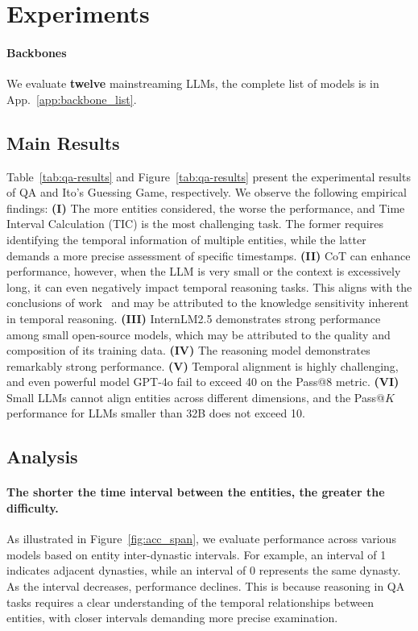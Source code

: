 

\section{Experiments}
\paragraph{Backbones}
We evaluate \textbf{twelve} mainstreaming LLMs,
the complete list of models is in App.~\ref{app:backbone_list}.
\subsection{Main Results}
Table~\ref{tab:qa-results} and Figure~\ref{tab:qa-results} present the experimental results of QA and Ito's Guessing Game, respectively.
We observe the following empirical findings:
\textbf{(I)} The more entities considered, the worse the performance, and Time Interval Calculation (TIC) is the most challenging task.
The former requires identifying the temporal information of multiple entities, while the latter demands a more precise assessment of specific timestamps.
\textbf{(II)} CoT can enhance performance, however, when the LLM is very small or the context is excessively long, it can even negatively impact temporal reasoning tasks.
This aligns with the conclusions of work~\cite{chu-etal-2024-timebench} and may be attributed to the knowledge sensitivity inherent in temporal reasoning.
\textbf{(III)} InternLM2.5 demonstrates strong performance among small open-source models, which may be attributed to the quality and composition of its training data.
\textbf{(IV)} The reasoning model demonstrates remarkably strong performance.
\textbf{(V)} Temporal alignment is highly challenging, and even powerful model GPT-4o fail to exceed 40 on the Pass@8 metric.
\textbf{(VI)} Small LLMs cannot align entities across different dimensions, and the Pass@$K$ performance for LLMs smaller than 32B does not exceed 10.

\subsection{Analysis}
\paragraph{The shorter the time interval between the entities, the greater the difficulty.}
As illustrated in Figure~\ref{fig:acc_span}, we evaluate performance across various models based on entity inter-dynastic intervals.
For example, an interval of 1 indicates adjacent dynasties, while an interval of 0 represents the same dynasty. 
As the interval decreases, performance declines.
This is because reasoning in QA tasks requires a clear understanding of the temporal relationships between entities, with closer intervals demanding more precise examination.


